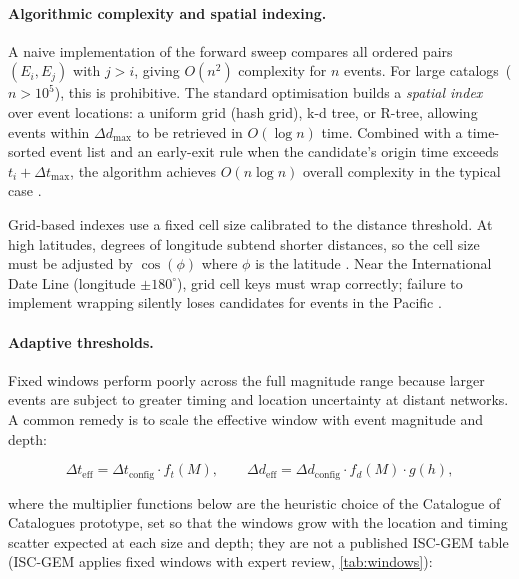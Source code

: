 \documentclass[12pt]{article}
\newcommand{\catalogs}{catalogs}
\begin{document}
\paragraph{Algorithmic complexity and spatial indexing.}
A naive implementation of the forward sweep compares all ordered pairs
$(E_i, E_j)$ with $j > i$, giving $O(n^2)$ complexity for $n$ events.
For large \catalogs\ ($n > 10^5$), this is prohibitive.  The standard
optimisation builds a \emph{spatial index} over event locations: a uniform
grid (hash grid), k-d tree, or R-tree, allowing events within $\Delta d_{\max}$
to be retrieved in $O(\log n)$ time.  Combined with a time-sorted event list
and an early-exit rule when the candidate's origin time exceeds
$t_i + \Delta t_{\max}$, the algorithm achieves $O(n \log n)$ overall
complexity in the typical case \citep{Patton2016}.

Grid-based indexes use a fixed cell size calibrated to the distance threshold.
At high latitudes, degrees of longitude subtend shorter distances, so the cell
size must be adjusted by $\cos(\phi)$ where $\phi$ is the latitude
\citep{Tan2021}.  Near the International Date Line (longitude $\pm 180^\circ$),
grid cell keys must wrap correctly; failure to implement wrapping silently loses
candidates for events in the Pacific \citep{DeadSea2022}.

\paragraph{Adaptive thresholds.}
Fixed windows perform poorly across the full magnitude range because larger
events are subject to greater timing and location uncertainty at distant
networks.  A common remedy is to scale the effective window with event magnitude
and depth:

\begin{equation}
  \Delta t_{\mathrm{eff}} = \Delta t_{\mathrm{config}} \cdot f_t(M),
  \qquad
  \Delta d_{\mathrm{eff}} = \Delta d_{\mathrm{config}} \cdot f_d(M) \cdot g(h),
  \label{eq:adaptive}
\end{equation}

where the multiplier functions below are the heuristic choice of the
Catalogue of Catalogues prototype, set so that the windows grow with the
location and timing scatter expected at each size and depth; they are not a
published ISC-GEM table (ISC-GEM applies fixed windows with expert review,
\cref{tab:windows}):
\end{document}

